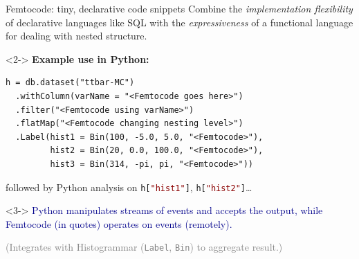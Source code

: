 \documentclass{beamer}
\begin{document}
\begin{frame}[fragile]{Femtocode: tiny, declarative code snippets}
\vspace{0.4 cm}
Combine the {\it implementation flexibility} of declarative languages like SQL with the {\it expressiveness} of a functional language for dealing with nested structure.

\vspace{0.5 cm}
\begin{uncoverenv}<2->
{\bf Example use in Python:}

\small
\begin{verbatim}
h = db.dataset("ttbar-MC")
  .withColumn(varName = "<Femtocode goes here>")
  .filter("<Femtocode using varName>")
  .flatMap("<Femtocode changing nesting level>")
  .Label(hist1 = Bin(100, -5.0, 5.0, "<Femtocode>"),
         hist2 = Bin(20, 0.0, 100.0, "<Femtocode>"),
         hist3 = Bin(314, -pi, pi, "<Femtocode>"))
\end{verbatim}

\normalsize
followed by Python analysis on {\small\tt h[\textcolor{darkred}{"hist1"}]}, {\small\tt h[\textcolor{darkred}{"hist2"}]}\ldots
\end{uncoverenv}

\vspace{0.1 cm}
\begin{uncoverenv}<3->
\textcolor{darkblue}{Python manipulates streams of events and accepts the output, while Femtocode (in quotes) operates on events (remotely).}

\vspace{0.1 cm}
\textcolor{gray}{(Integrates with Histogrammar ({\tt\small Label}, {\tt\small Bin}) to aggregate result.)}
\end{uncoverenv}
\end{frame}
\end{document}
